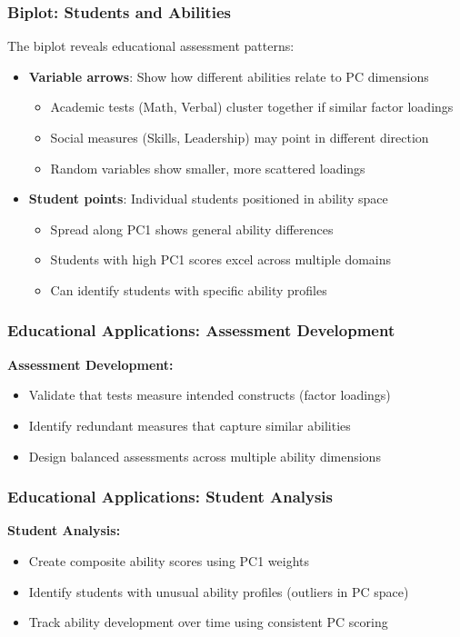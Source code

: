 \documentclass[aspectratio=169]{beamer}
\begin{document}
\begin{frame}
    \frametitle{Biplot: Students and Abilities}
    The biplot reveals educational assessment patterns:
    \begin{itemize}
        \item \textbf{Variable arrows}: Show how different abilities relate to PC dimensions \pause
              \begin{itemize}
                  \item Academic tests (Math, Verbal) cluster together if similar factor loadings \pause
                  \item Social measures (Skills, Leadership) may point in different direction \pause
                  \item Random variables show smaller, more scattered loadings \pause
              \end{itemize}
        \item \textbf{Student points}: Individual students positioned in ability space \pause
              \begin{itemize}
                  \item Spread along PC1 shows general ability differences \pause
                  \item Students with high PC1 scores excel across multiple domains \pause
                  \item Can identify students with specific ability profiles \pause
              \end{itemize}
    \end{itemize}
\end{frame}

\begin{frame}
    \frametitle{Educational Applications: Assessment Development}
    \textbf{Assessment Development:}
    \begin{itemize}
        \item Validate that tests measure intended constructs (factor loadings) \pause
        \item Identify redundant measures that capture similar abilities \pause
        \item Design balanced assessments across multiple ability dimensions \pause
    \end{itemize}
\end{frame}

\begin{frame}
    \frametitle{Educational Applications: Student Analysis}
    \textbf{Student Analysis:}
    \begin{itemize}
        \item Create composite ability scores using PC1 weights \pause
        \item Identify students with unusual ability profiles (outliers in PC space) \pause
        \item Track ability development over time using consistent PC scoring \pause
    \end{itemize}
\end{frame}
\end{document}
